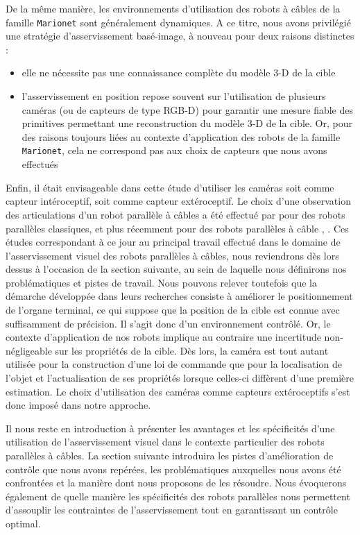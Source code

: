 De la même manière, les environnements d'utilisation des robots à câbles de la 
famille {\tt Marionet} sont généralement dynamiques. A ce titre, nous avons 
privilégié une stratégie d'asservissement basé-image, à nouveau pour deux 
raisons distinctes :
\begin{itemize}
\item elle ne nécessite pas une connaissance complète du modèle 3-D de la cible 
\item l'asservissement en position repose souvent sur l'utilisation de plusieurs 
caméras (ou de capteurs de type RGB-D) pour garantir une mesure fiable des 
primitives permettant une reconstruction du modèle 3-D de la cible. Or, pour des 
raisons toujours liées au contexte d'application des robots de la famille {\tt 
Marionet}, cela ne correspond pas aux choix de capteurs que nous avons effectués
\end{itemize}

Enfin, il était envisageable dans cette étude d'utiliser les caméras soit comme 
capteur intéroceptif, soit comme capteur extéroceptif. Le choix d'une 
observation des articulations d'un robot parallèle à câbles a été effectué par 
\cite{andreff2007} pour des robots parallèles classiques, et plus récemment pour 
des robots parallèles à câble \cite{dallej2011}, \cite{dallej2012}. Ces études 
correspondant à ce jour au principal travail effectué dans le domaine de 
l'asservissement visuel des robots parallèles à câbles, nous reviendrons dès 
lors dessus à l'occasion de la section suivante, au sein de laquelle nous 
définirons nos problématiques et pistes de travail. Nous pouvons relever 
toutefois que la démarche développée dans leurs recherches consiste à améliorer 
le positionnement de l'organe terminal, ce qui suppose que la position de la 
cible est connue avec suffisamment de précision. Il s'agit donc d'un 
environnement contrôlé. Or, le contexte d'application de nos robots implique au 
contraire une incertitude non-négligeable sur les propriétés de la cible. Dès 
lors, la caméra est tout autant utilisée pour la construction d'une loi de 
commande que pour la localisation de l'objet et l'actualisation de ses 
propriétés lorsque celles-ci diffèrent d'une première estimation. Le choix 
d'utilisation des caméras comme capteurs extéroceptifs s'est donc imposé dans 
notre approche.

Il nous reste en introduction à présenter les avantages et les spécificités 
d'une utilisation de l'asservissement visuel dans le contexte particulier des 
robots parallèles à câbles. La section suivante introduira les pistes 
d'amélioration de contrôle que nous avons repérées, les problématiques 
auxquelles nous avons été confrontées et la manière dont nous proposons de les 
résoudre. Nous évoquerons également de quelle manière les spécificités des 
robots parallèles nous permettent d'assouplir les contraintes de 
l'asservissement tout en garantissant un contrôle optimal.

